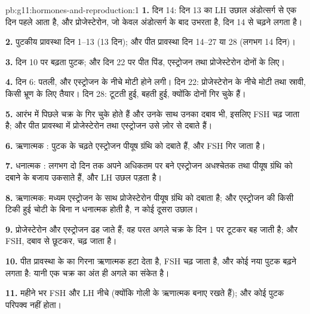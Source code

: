 \begin{solution}{pb:g11:hormones-and-reproduction:1}
\textbf{1.} दिन 14: दिन 13 का LH उछाल अंडोत्सर्ग से एक दिन पहले आता है,
और प्रोजेस्टेरोन, जो केवल अंडोत्सर्ग के बाद उभरता है, दिन 14 से चढ़ने लगता
है।

\textbf{2.} पुटकीय प्रावस्था दिन 1--13 (13 दिन); और पीत प्रावस्था दिन
14--27 या 28 (लगभग 14 दिन)।

\textbf{3.} दिन 10 पर बढ़ता पुटक; और दिन 22 पर पीत पिंड, एस्ट्रोजन तथा
प्रोजेस्टेरोन दोनों के लिए।

\textbf{4.} दिन 6: पतली, और एस्ट्रोजन के नीचे मोटी होने लगी। दिन 22:
प्रोजेस्टेरोन के नीचे मोटी तथा स्रावी, किसी भ्रूण के लिए तैयार। दिन 28:
टूटती हुई, बहती हुई, क्योंकि दोनों  गिर चुके हैं।

\textbf{5.} आरंभ में पिछले चक्र के  गिर चुके होते हैं और उनके साथ
उनका दबाव भी, इसलिए FSH चढ़ जाता है; और पीत प्रावस्था में प्रोजेस्टेरोन तथा
एस्ट्रोजन उसे ज़ोर से दबाते हैं।

\textbf{6.} ऋणात्मक : पुटक के चढ़ते एस्ट्रोजन पीयूष ग्रंथि को
दबाते हैं, और FSH गिर जाता है।

\textbf{7.} धनात्मक : लगभग दो दिन तक अपने अधिकतम पर बने
एस्ट्रोजन अधश्चेतक तथा पीयूष ग्रंथि को दबाने के बजाय उकसाते हैं, और LH
उछल पड़ता है।

\textbf{8.} ऋणात्मक: मध्यम एस्ट्रोजन के साथ प्रोजेस्टेरोन पीयूष ग्रंथि को
दबाता है; और एस्ट्रोजन की किसी टिकी हुई चोटी के बिना न धनात्मक 
होती है, न कोई दूसरा उछाल।

\textbf{9.} प्रोजेस्टेरोन और एस्ट्रोजन ढह जाते हैं; वह परत अगले चक्र के
दिन 1 पर टूटकर बह जाती है; और FSH, दबाव से छूटकर, चढ़ जाता है।

\textbf{10.} पीत प्रावस्था के  का गिरना ऋणात्मक  हटा
देता है, FSH चढ़ जाता है, और कोई नया पुटक बढ़ने लगता है: यानी एक चक्र का
अंत ही अगले का संकेत है।

\textbf{11.} महीने भर FSH और LH नीचे (क्योंकि गोली के  ऋणात्मक
 बनाए रखते हैं); और कोई पुटक परिपक्व नहीं होता।


\end{solution}
